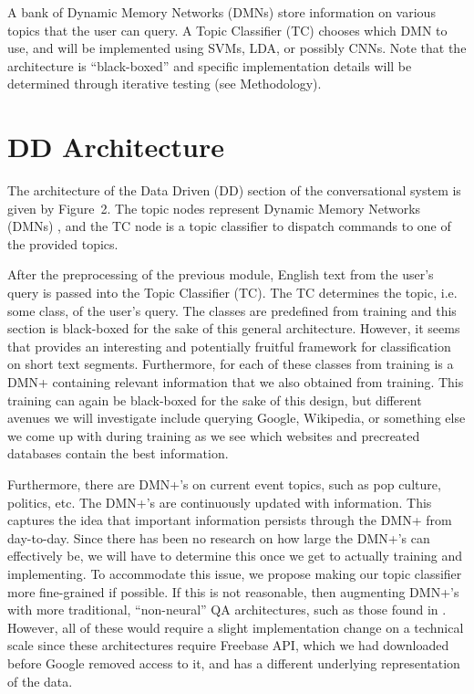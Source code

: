 \documentclass[10pt,twoside,twocolumn]{article}
\begin{document}
\noindent
A bank of Dynamic Memory Networks (DMNs) \cite{Kumar:2015, Xiong2016} store information on various topics that the user can query. A Topic Classifier (TC) chooses which DMN to use, and will be implemented using SVMs\cite{Joachims1998, Pilaszy2005}, LDA\cite{Blei2001, Zhao2011}, or possibly CNNs\cite{Kim2014}. Note that the architecture is ``black-boxed'' and specific implementation details will be determined through iterative testing (see Methodology).

\section{DD Architecture}
The architecture of the Data Driven (DD) section of the conversational system is given by Figure~2. The topic nodes represent Dynamic Memory Networks (DMNs) \cite{Kumar:2015, Xiong2016}, and the TC node is a topic classifier to dispatch commands to one of the provided topics.

\noindent
After the preprocessing of the previous module, English text from the user's query is passed into the Topic Classifier (TC). The TC determines the topic, i.e. some class, of the user's query. The classes are predefined from training and this section is black-boxed for the sake of this general architecture. However, it seems that \cite{Zhao2011} provides an interesting and potentially fruitful framework for classification on short text segments. Furthermore, for each of these classes from training is a DMN+ \cite{Xiong2016} containing relevant information that we also obtained from training. This training can again be black-boxed for the sake of this design, but different avenues we will investigate include querying Google, Wikipedia, or something else we come up with during training as we see which websites and precreated databases contain the best information.

\noindent
Furthermore, there are DMN+'s on current event topics, such as pop culture, politics, etc. The DMN+'s are continuously updated with information. This captures the idea that important information persists through the DMN+ from day-to-day. Since there has been no research on how large the DMN+'s can effectively be, we will have to determine this once we get to actually training and implementing. To accommodate this issue, we propose making our topic classifier more fine-grained if possible. If this is not reasonable, then augmenting DMN+'s with more traditional, ``non-neural'' QA architectures, such as those found in \cite{Iyyer2014, Yao2014a, Yao2014b}. However, all of these would require a slight implementation change on a technical scale since these architectures require Freebase API, which we had downloaded before Google removed access to it, and has a different underlying representation of the data.
\end{document}
